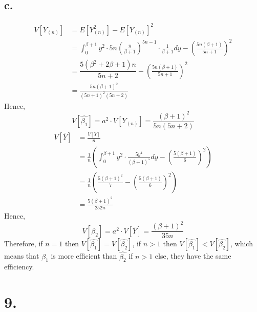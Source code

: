 \documentclass[11pt]{article}
\begin{document}
\subsection*{c.}
\begin{equation*}
    \begin{aligned}
        V[Y_{(n)}] &= E[Y_{(n)}^2] - E[Y_{(n)}]^2 \\
        &= \int_0^{\beta+1} y^2 \cdot 5n \left(\frac{y}{\beta+1} \right)^{5n-1} \cdot \frac{1}{\beta+1} dy - \left(\frac{5n(\beta+1)}{5n+1} \right)^2 \\
        &= \dfrac{5\left({\beta}^2+2{\beta}+1\right)n}{5n+2} - \left(\frac{5n(\beta+1)}{5n+1} \right)^2 \\
        &= \frac{5n(\beta+1)^2}{(5n+1)^2 (5n+2)}
    \end{aligned}
\end{equation*}
Hence, 
\[
    V[\hat{\beta_1}] = a^2 \cdot V[Y_{(n)}] = \frac{(\beta+1)^2}{5n(5n+2)}    
\]
\begin{equation*}
    \begin{aligned}
        V[\overline{Y}] 
        &= \frac{V[Y]}{n} \\
        &= \frac{1}{n} \left(\int_0^{\beta+1} y^2 \cdot \frac{5y^4}{(\beta+1)^5} dy - \left(\frac{5(\beta+1)}{6}\right)^2 \right) \\
        &= \frac{1}{n} \left( \frac{5(\beta+1)^2}{7} - \left(\frac{5(\beta+1)}{6}\right)^2 \right) \\
        &= \frac{5(\beta+1)^2}{252n}
    \end{aligned}
\end{equation*}
Hence, 
\[
    V[\hat{\beta_2}] = a^2 \cdot V[\overline{Y}] = \frac{(\beta+1)^2}{35n}    
\]
Therefore, if $n=1$ then $V[\hat{\beta_1}] = V[\hat{\beta_2}]$, if $n>1$ then $V[\hat{\beta_1}] < V[\hat{\beta_2}]$,
which means that $\hat{\beta_1}$ is more efficient than $\hat{\beta_2}$ if $n>1$ else, they have the same efficiency. 
\pagebreak
\section*{9.}
\end{document}
